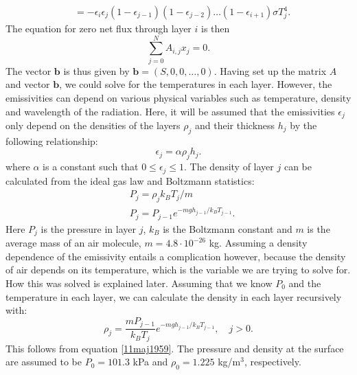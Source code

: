 \documentclass[twocolumn]{article}
\begin{document}
\begin{large}
\begin{equation}
\begin{split}
        &= -\epsilon_i\epsilon_j(1-\epsilon_{j-1})(1-\epsilon_{j-2})\dots(1-\epsilon_{i+1})\sigma T_j^4.
    \end{split}
\end{equation}
The equation for zero net flux through layer $i$ is then
\begin{equation}
    \sum_{j=0}^{N}A_{i,j}x_j = 0.
\end{equation}
The vector $\mathbf{b}$ is thus given by $\mathbf{b} = (S,0,0,\dots,0)$. Having set up the matrix $A$ and vector $\mathbf{b}$, we could solve for the temperatures in each layer. However, the emissivities can depend on various physical variables such as temperature, density and wavelength of the radiation. Here, it will be assumed that the emissivities $\epsilon_j$ only depend on the densities of the layers $\rho_j$ and their thickness $h_j$ by the following relationship:
\begin{equation}
    \label{11maj1708}
    \epsilon_j = \alpha\rho_jh_j.
\end{equation}
where $\alpha$ is a constant such that $0\leq\epsilon_j\leq 1$. The density of layer $j$ can be calculated from the ideal gas law and Boltzmann statistics:
\begin{equation}
    \label{11maj1959}
    \begin{split}
        &P_j = \rho_jk_BT_j/m \\ 
        &P_j = P_{j-1}e^{-mgh_{j-1}/k_BT_{j-1}}.
    \end{split}
\end{equation}
Here $P_j$ is the pressure in layer $j$, $k_B$ is the Boltzmann constant and $m$ is the average mass of an air molecule, $m=4.8\cdot 10^{-26}$ kg. Assuming a density dependence of the emissivity entails a complication however, because the density of air depends on its temperature, which is the variable we are trying to solve for. How this was solved is explained later. Assuming that we know $P_0$ and the temperature in each layer, we can calculate the density in each layer recursively with:
\begin{equation}
    \label{11maj1707}
    \rho_j = \frac{mP_{j-1}}{k_BT_j}e^{-mgh_{j-1}/k_BT_{j-1}},\quad j>0.
\end{equation}
This follows from equation \eqref{11maj1959}. The pressure and density at the surface are assumed to be $P_0=101.3$ kPa and $\rho_0=1.225$ kg/m$^3$, respectively.


\end{large}
\end{document}
